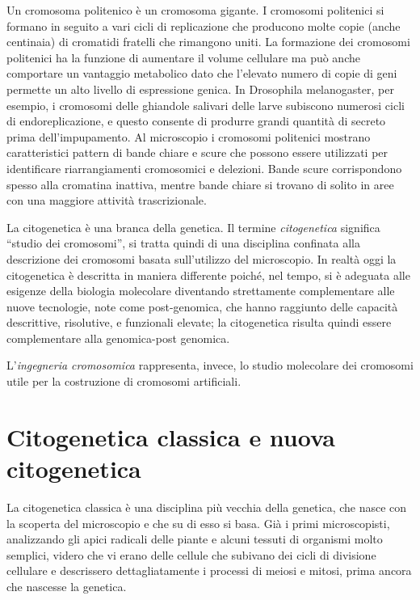 \documentclass[11pt]{book}
\begin{document}
Un cromosoma politenico è un cromosoma gigante. I cromosomi politenici si formano in seguito a vari cicli di replicazione che producono molte copie (anche centinaia) di cromatidi fratelli che rimangono uniti.
La formazione dei cromosomi politenici ha la funzione di aumentare il volume cellulare ma può anche comportare un vantaggio metabolico dato che l'elevato numero di copie di geni permette un alto livello di espressione genica. In Drosophila melanogaster, per esempio, i cromosomi delle ghiandole salivari delle larve subiscono numerosi cicli di endoreplicazione, e questo consente di produrre grandi quantità di secreto prima dell'impupamento.
Al microscopio i cromosomi politenici mostrano caratteristici pattern di bande chiare e scure che possono essere utilizzati per identificare riarrangiamenti cromosomici e delezioni. Bande scure corrispondono spesso alla cromatina inattiva, mentre bande chiare si trovano di solito in aree con una maggiore attività trascrizionale.

La citogenetica è una branca della genetica. Il termine \emph{citogenetica} significa ``studio dei cromosomi'', si tratta quindi di una disciplina confinata alla descrizione dei cromosomi basata sull’utilizzo del microscopio.
In realtà oggi la citogenetica è descritta in maniera differente poiché, nel tempo, si è adeguata alle esigenze della biologia molecolare diventando strettamente complementare alle nuove tecnologie, note come post-genomica, che hanno raggiunto delle capacità descrittive, risolutive, e funzionali elevate; la citogenetica risulta quindi essere complementare alla genomica-post genomica. 

L’\emph{ingegneria cromosomica} rappresenta, invece, lo studio molecolare dei cromosomi utile per la costruzione di cromosomi artificiali.  

\section{Citogenetica classica e nuova citogenetica}
La citogenetica classica è una disciplina più vecchia della genetica, che nasce con la scoperta del microscopio e che su di esso si basa. Già i primi microscopisti, analizzando gli apici radicali delle piante e alcuni tessuti di organismi molto semplici, videro che vi erano delle cellule che subivano dei cicli di divisione cellulare e descrissero dettagliatamente i processi di meiosi e mitosi, prima ancora che nascesse la genetica.
\end{document}

